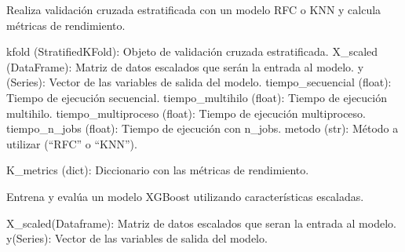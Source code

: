 \documentclass[letterpaper,10pt,spanish]{sphinxmanual}
\begin{document}

\begin{fulllineitems}
\label{\detokenize{Reduccion_Dimension:Modelos.metricas_rfc_knn}}
\pysigstartsignatures
\pysiglinewithargsret
{}
{\sphinxparamcomma {}\sphinxparamcomma {}\sphinxparamcomma {}\sphinxparamcomma {}\sphinxparamcomma {}\sphinxparamcomma {}\sphinxparamcomma {}}
{}
\pysigstopsignatures
\sphinxAtStartPar
Realiza validación cruzada estratificada con un modelo RFC o KNN y calcula métricas de rendimiento.
\begin{description}
\sphinxAtStartPar
kfold (StratifiedKFold): Objeto de validación cruzada estratificada.
X\_scaled (DataFrame): Matriz de datos escalados que serán la entrada al modelo.
y (Series): Vector de las variables de salida del modelo.
tiempo\_secuencial (float): Tiempo de ejecución secuencial.
tiempo\_multihilo (float): Tiempo de ejecución multihilo.
tiempo\_multiproceso (float): Tiempo de ejecución multiproceso.
tiempo\_n\_jobs (float): Tiempo de ejecución con n\_jobs.
metodo (str): Método a utilizar (“RFC” o “KNN”).

\sphinxAtStartPar
K\_metrics (dict): Diccionario con las métricas de rendimiento.

\end{description}

\end{fulllineitems}


\begin{fulllineitems}
\label{\detokenize{Reduccion_Dimension:Modelos.model}}
\pysigstartsignatures
\pysiglinewithargsret
{}
{\sphinxparamcomma {}\sphinxparamcomma {}\sphinxparamcomma {}\sphinxparamcomma {}}
{}
\pysigstopsignatures
\sphinxAtStartPar
Entrena y evalúa un modelo XGBoost utilizando características escaladas.
\begin{description}
\sphinxAtStartPar
X\_scaled(Dataframe): Matriz de datos escalados que seran la entrada al modelo.
y(Series): Vector de las variables de salida del modelo.

\end{description}

\end{fulllineitems}
\end{document}
